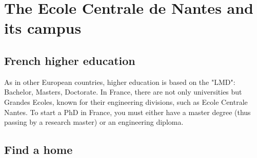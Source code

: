 \chapter{The Ecole Centrale de Nantes and its campus}

\section{French higher education}


As in other European countries, higher education is based on the "LMD": Bachelor, Masters, Doctorate.
In France, there are not only universities but Grandes Ecoles, known for their engineering divisions, such as Ecole Centrale Nantes.
To start a PhD in France, you must either have a master degree (thus passing by a research master) or an engineering diploma.



\section{Find a home}
